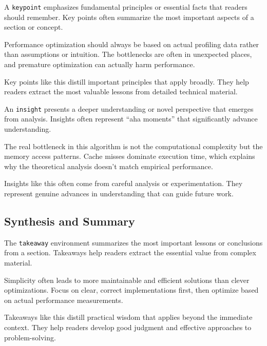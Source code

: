 \documentclass[9pt]{amsart}
\begin{document}
A \texttt{keypoint} emphasizes fundamental principles or essential facts that
readers should remember. Key points often summarize the most important aspects
of a section or concept.

\begin{keypoint}
    Performance optimization should always be based on actual profiling data rather than assumptions or intuition. The bottlenecks are often in unexpected places, and premature optimization can actually harm performance.
\end{keypoint}

Key points like this distill important principles that apply broadly. They help
readers extract the most valuable lessons from detailed technical material.

An \texttt{insight} presents a deeper understanding or novel perspective that
emerges from analysis. Insights often represent ``aha moments'' that
significantly advance understanding.

\begin{insight}
    The real bottleneck in this algorithm is not the computational complexity but the memory access patterns. Cache misses dominate execution time, which explains why the theoretical analysis doesn't match empirical performance.
\end{insight}

Insights like this often come from careful analysis or experimentation. They
represent genuine advances in understanding that can guide future work.

\subsection{Synthesis and Summary}

The \texttt{takeaway} environment summarizes the most important lessons or
conclusions from a section. Takeaways help readers extract the essential value
from complex material.

\begin{takeaway}
    Simplicity often leads to more maintainable and efficient solutions than clever optimizations. Focus on clear, correct implementations first, then optimize based on actual performance measurements.
\end{takeaway}

Takeaways like this distill practical wisdom that applies beyond the immediate
context. They help readers develop good judgment and effective approaches to
problem-solving.
\end{document}
